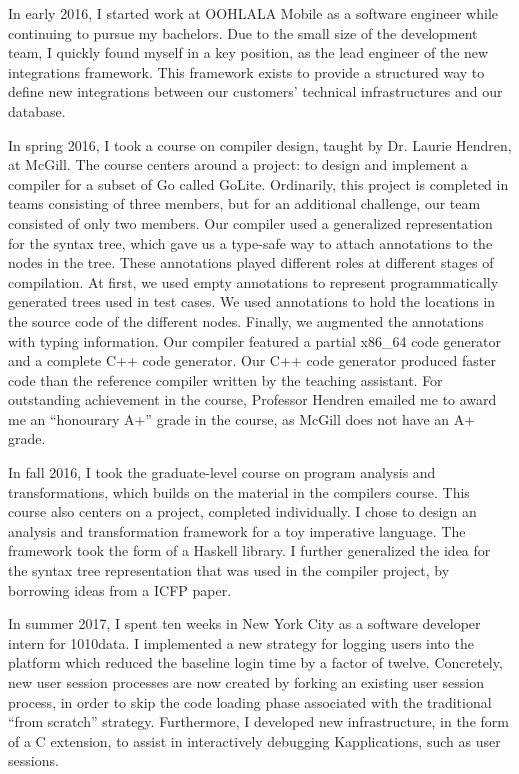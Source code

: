 \documentclass[11pt,letterpaper]{article}
\begin{document}
In early 2016, I started work at OOHLALA Mobile\footnotemark{} as a software
engineer while continuing to pursue my bachelors. Due to the small size of the
development team, I quickly found myself in a key position, as the lead
engineer of the new integrations framework. This framework exists to provide a
structured way to define new integrations between our customers' technical
infrastructures and our database.
%

In spring 2016, I took a course on compiler design, taught by Dr. Laurie
Hendren, at McGill. The course centers around a project: to design and
implement a compiler for a subset of Go called GoLite. Ordinarily, this project
is completed in teams consisting of three members, but for an additional
challenge, our team consisted of only two members. Our compiler used a
generalized representation for the syntax tree, which gave us a type-safe way
to attach annotations to the nodes in the tree. These annotations played
different roles at different stages of compilation. At first, we used empty
annotations to represent programmatically generated trees used in test cases.
We used annotations to hold the locations in the source code of the different
nodes. Finally, we augmented the annotations with typing information.
%
Our compiler featured a partial x86\_64 code generator and a complete C++ code
generator. Our C++ code generator produced faster code than the reference
compiler written by the teaching assistant.
%
For outstanding achievement in the course, Professor Hendren emailed me to
award me an ``honourary A+'' grade in the course, as McGill does not have an A+
grade.

In fall 2016, I took the graduate-level course on program analysis and
transformations, which builds on the material in the compilers course.
This course also centers on a project, completed individually. I chose to
design an analysis and transformation framework for a toy imperative language.
The framework took the form of a Haskell library. I further generalized the
idea for the syntax tree representation that was used in the compiler project,
by borrowing ideas from a ICFP paper\footnotemark.
%

In summer 2017, I spent ten weeks in New York City as a software developer
intern for 1010data\footnotemark{}. I implemented a new strategy for logging
users into the platform which reduced the baseline login time by a factor of
twelve. Concretely, new user session processes are now created by forking an
existing user session process, in order to skip the code loading phase
associated with the traditional ``from scratch'' strategy.
%
%
%
Furthermore, I developed new infrastructure, in the form of a C extension, to
assist in interactively debugging K\footnotemark applications, such as user
sessions.
%
\end{document}
